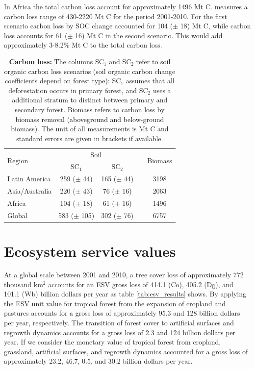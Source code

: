 		In Africa the total carbon loss account for approximately 1496 Mt C. \citet{Achard2014} measures a carbon loss range of 430-2220 Mt C for the period 2001-2010. For the first scenario carbon loss by \ac{SOC} change accounted for 104 ($\pm$ 18) Mt C, while carbon loss accounts for 61 ($\pm$ 16) Mt C in the second scenario. This would add approximately 3-8.2\% Mt C to the total carbon loss.
		\begin{table}[ht]
			\centering
			\caption[Carbon loss]{\textbf{Carbon loss:} The columns SC$_1$ and SC$_2$ refer to soil organic carbon loss scenarios (soil organic carbon change coefficients depend on forest type): SC$_1$ assumes that all deforestation occurs in primary forest, and SC$_2$ uses a additional stratum to distinct between primary and secondary forest. Biomass refers to carbon loss by biomass removal (aboveground and below-ground biomass). The unit of all measurements is Mt C and standard errors are given in brackets if available.}
			\label{tab:soce_tab}
			\begin{tabular}{lccrc}
				\hline
				\multirow{2}{*}{Region}& \multicolumn{2}{c}{Soil} && \multirow{2}{*}{Biomass} \\\cline{2-3}
				& SC$_1$ & SC$_2$ && \\\hline
				Latin America & 259 ($\pm$ 44) & 165 ($\pm$ 44) && 3198\\
				Asia/Australia & 220 ($\pm$ 43) & 76 ($\pm$ 16) && 2063\\
				Africa & 104 ($\pm$ 18) & 61 ($\pm$ 16) && 1496\\
				Global & 583 ($\pm$ 105) & 302 ($\pm$ 76) && 6757\\\hline
			\end{tabular}
		\end{table}

	\section{Ecosystem service values}
		At a global scale between 2001 and 2010, a tree cover loss of approximately 772 thousand km$^2$ accounts for an \ac{ESV} gross loss of 414.1 (Co), 405.2 (Dg), and 101.1 (Wb) billion dollars per year as table \ref{tab:esv_results} shows. By applying the \ac{ESV} unit value for tropical forest from \citet{Costanza2014} the expansion of cropland and pastures accounts for a gross loss of approximately 95.3 and 128 billion dollars per year, respectively. The transition of forest cover to artificial surfaces and regrowth dynamics accounts for a gross loss of 2.3 and 124 billion dollars per year. If we consider the monetary value of tropical forest from \citet{Siikamaki2015} cropland, grassland, artificial surfaces, and regrowth dynamics accounted for a gross loss of approximately 23.2, 46.7, 0.5, and 30.2 billion dollars per year.

